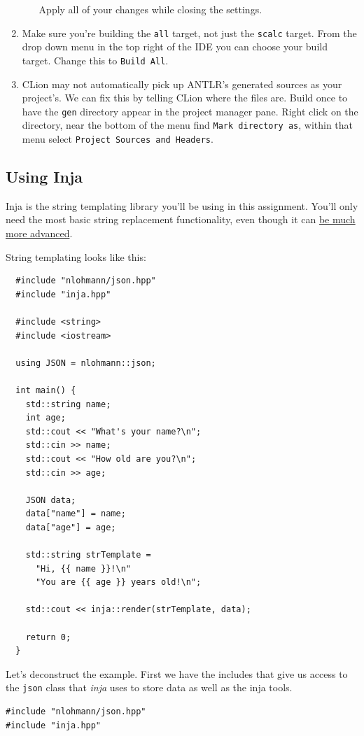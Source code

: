 \documentclass{article}
\newcommand{\code}[1]{\texttt{\textmd{#1}}}
\begin{document}
\begin{enumerate}
\begin{enumerate}
        Apply all of your changes while closing the settings.
    \end{enumerate}
  \item
    Make sure you're building the \texttt{all} target, not just the \texttt{scalc} target. From the
    drop down menu in the top right of the IDE you can choose your build target. Change this to
    \texttt{Build All}.
  \item
    CLion may not automatically pick up ANTLR's generated sources as your project's. We can fix
    this by telling CLion where the files are. Build once to have the \code{gen} directory appear
    in the project manager pane. Right click on the directory, near the bottom of the menu find
    \texttt{Mark directory as}, within that menu select \texttt{Project Sources and Headers}.
\end{enumerate}

\subsection{Using Inja}
Inja is the string templating library you'll be using in this assignment. You'll only need the most
basic string replacement functionality, even though it can
\href{https://github.com/pantor/inja\#tutorial}{be much more advanced}.

String templating looks like this:
\begin{lstlisting}
  #include "nlohmann/json.hpp"
  #include "inja.hpp"

  #include <string>
  #include <iostream>

  using JSON = nlohmann::json;

  int main() {
    std::string name;
    int age;
    std::cout << "What's your name?\n";
    std::cin >> name;
    std::cout << "How old are you?\n";
    std::cin >> age;

    JSON data;
    data["name"] = name;
    data["age"] = age;

    std::string strTemplate =
      "Hi, {{ name }}!\n"
      "You are {{ age }} years old!\n";

    std::cout << inja::render(strTemplate, data);

    return 0;
  }
\end{lstlisting}

Let's deconstruct the example. First we have the includes that give us access to the \code{json}
class that \textit{inja} uses to store data as well as the inja tools.
\begin{lstlisting}
#include "nlohmann/json.hpp"
#include "inja.hpp"
\end{lstlisting}
\end{document}
